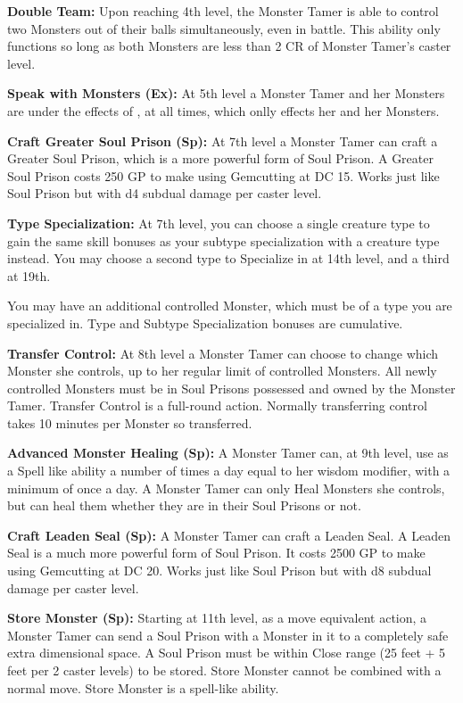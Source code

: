 \textbf{Double Team:} Upon reaching 4th level, the Monster Tamer is able to control two Monsters out of their balls simultaneously, even in battle. This ability only functions so long as both Monsters are less than 2 CR of  Monster Tamer's caster level.

\textbf{Speak with Monsters (Ex):} At 5th level a Monster Tamer and her Monsters are under the effects of , at all times, which onlly effects her and her Monsters.

\textbf{Craft Greater Soul Prison (Sp):} At 7th level a Monster Tamer can craft a Greater Soul Prison, which is a more powerful form of Soul Prison. A Greater Soul Prison costs 250 GP to make using  Gemcutting at DC 15. Works just like Soul Prison but with d4 subdual damage per caster level.

\textbf{Type Specialization:} At 7th level, you can choose a single creature type to gain the same skill bonuses as your subtype specialization
with a creature type instead. You may choose a second type to Specialize in at 14th level, and a third at 19th.

You may have an additional controlled Monster, which must be of a type you are specialized in. Type and Subtype Specialization bonuses are cumulative.

\textbf{Transfer Control:} At 8th level a Monster Tamer can choose to change which Monster she controls, up to her regular limit of controlled Monsters. All newly controlled Monsters must be in Soul Prisons possessed and owned by the Monster Tamer. Transfer Control is a full-round action. Normally transferring control takes 10 minutes per Monster so transferred.

\textbf{Advanced Monster Healing (Sp):} A Monster Tamer can, at 9th level, use  as a Spell like ability a number of times a day equal to her wisdom modifier, with a minimum of once a day. A Monster Tamer can only Heal Monsters she controls, but can heal them whether they are in their Soul Prisons or not.

\textbf{Craft Leaden Seal (Sp):} A Monster Tamer can craft a Leaden Seal. A Leaden Seal is a much more powerful form of Soul Prison. It costs 2500 GP to make using  Gemcutting at DC 20. Works just like Soul Prison but with d8 subdual damage per caster level.

\textbf{Store Monster (Sp):} Starting at 11th level, as a move equivalent action, a Monster Tamer can send a Soul Prison with a Monster in it to a completely safe extra dimensional space. A Soul Prison must be within Close range (25 feet + 5 feet per 2 caster levels) to be stored. Store Monster cannot be combined with a normal move. Store Monster is a spell-like ability.

